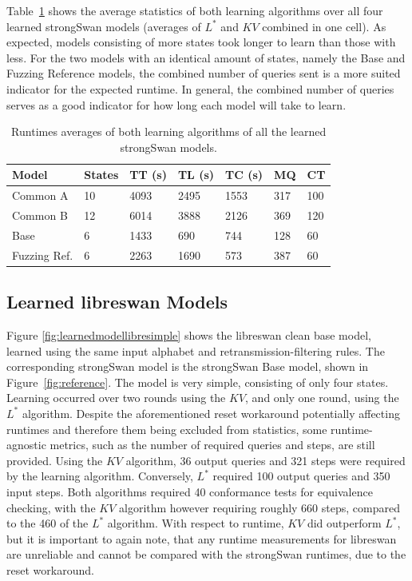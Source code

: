 Table~\ref{tab:runtime_summary_averages} shows the average statistics of both learning algorithms over all four learned strongSwan models (averages of $L^*$ and $KV$ combined in one cell). As expected, models consisting of more states took longer to learn than those with less. For the two models with an identical amount of states, namely the Base and Fuzzing Reference models, the combined number of queries sent is a more suited indicator for the expected runtime. In general, the combined number of queries serves as a good indicator for how long each model will take to learn. 

\begin{table}[h]
	\centering
	\begin{tabular}{|l|l|l|l|l|l|l|}
		\hline
		\rowcolor[HTML]{C0C0C0} 
		Model    	& States & TT (s)   & TL (s)   	  & TC (s)   & MQ  & CT  \\ \hline
		Common A  	& 10     & 4093 	  & 2495	 	  & 1553 	 & 317 & 100 \\ \hline
		Common B  	& 12     & 6014 	  & 3888		  & 2126 	 & 369 & 120 \\ \hline
		Base      	& 6      & 1433 	  & 690 		  & 744  	 & 128 & 60  \\ \hline
		Fuzzing Ref.& 6      & 2263 	  & 1690		  & 573  	 & 387 & 60  \\ \hline
	\end{tabular}
	\caption{Runtimes averages of both learning algorithms of all the learned strongSwan models.}
	\label{tab:runtime_summary_averages}
\end{table}

\subsection{Learned libreswan Models}
Figure \ref{fig:learnedmodellibresimple} shows the libreswan clean base model, learned using the same input alphabet and retransmission-filtering rules. The corresponding strongSwan model is the strongSwan Base model, shown in Figure~\ref{fig:reference}. The model is very simple, consisting of only four states. Learning occurred over two rounds using the $KV$, and only one round, using the $L^*$ algorithm. Despite the aforementioned reset workaround potentially affecting runtimes and therefore them being excluded from statistics, some runtime-agnostic metrics, such as the number of required queries and steps, are still provided. Using the $KV$ algorithm, 36 output queries and 321 steps were required by the learning algorithm. Conversely, $L^*$ required 100 output queries and 350 input steps. Both algorithms required 40 conformance tests for equivalence checking, with the $KV$ algorithm however requiring roughly 660 steps, compared to the 460 of the $L^*$ algorithm. With respect to runtime, $KV$ did outperform $L^*$, but it is important to again note, that any runtime measurements for libreswan are unreliable and cannot be compared with the strongSwan runtimes, due to the reset workaround.

